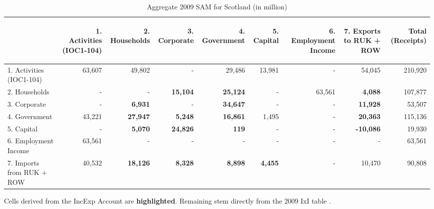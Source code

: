 \bigskip

\begin{table}[H] \caption{Aggregate 2009 SAM for Scotland (in \textsterling million)}
\bigskip \begin{scriptsize} \begin{centering} \begin{doublespacing}
    \begin{tabular}{lrrrrrrrr}
          \toprule
          & \begin{sideways}1. Activities (IOC1-104)\end{sideways} & \begin{sideways}2. Households\end{sideways} & \begin{sideways}3. Corporate\end{sideways} & \begin{sideways}4. Government\end{sideways} & \begin{sideways}5. Capital\end{sideways} & \begin{sideways}6. Employment Income\end{sideways} & \begin{sideways}7. Exports to RUK + ROW\end{sideways} & \begin{sideways}Total (Receipts)\end{sideways} \bigstrut\\
    \hline
    1. Activities (IOC1-104) & 63,607 & 49,802 & -     & 29,486 & 13,981 & -     & 54,045 & 210,920 \\
    2. Households & -     & -     & \textbf{15,104} & \textbf{25,124} & -     & 63,561 & \textbf{4,088} & 107,877 \\
    3. Corporate & -     & \textbf{6,931} & -     & \textbf{34,647} & -     & -     & \textbf{11,928} & 53,507 \\
    4. Government & 43,221 & \textbf{27,947} & \textbf{5,248} & \textbf{16,861} & 1,495 & -     & \textbf{20,363} & 115,136 \\
    5. Capital & -     & \textbf{5,070} & \textbf{24,826} & \textbf{119}   & -     & -     & \textbf{-10,086} & 19,930 \\
    6. Employment Income & 63,561 & -     & -     & -     & -     & -     & -     & 63,561 \\
    7. Imports from RUK + ROW & 40,532 & \textbf{18,126} & \textbf{8,328} & \textbf{8,898} & \textbf{4,455} & -     & 10,470 & 90,808 \\
\bottomrule 
\end{tabular}%
\bigskip \begin{flushright} Cells derived from the IncExp Account are \textbf{highlighted}. Remaining stem directly from the 2009 IxI table \cite{ScottishGovernment2013a}.\end{flushright} \label{tab:2.3.1} 
\end{doublespacing} \end{centering} \end{scriptsize} \end{table} \bigskip

